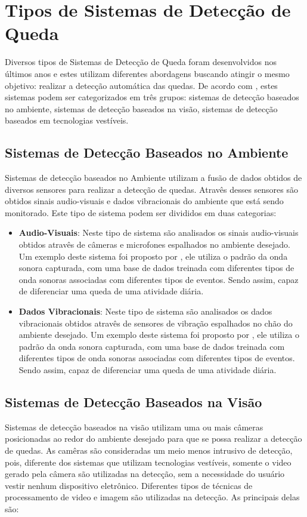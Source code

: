 \section{Tipos de Sistemas de Detecção de Queda}
\label{sec:fall_system_types}
Diversos tipos de Sistemas de Detecção de Queda foram desenvolvidos nos últimos anos e estes utilizam diferentes abordagens buscando atingir o mesmo objetivo: realizar a detecção automática das quedas. De acordo com \cite{mubashir2013survey}, estes sistemas podem ser categorizados em três grupos: sistemas de detecção baseados no ambiente, sistemas de detecção baseados na visão, sistemas de detecção baseados em tecnologias vestíveis.

\subsection{Sistemas de Detecção Baseados no Ambiente}
Sistemas de detecção baseados no Ambiente utilizam a fusão de dados obtidos de diversos sensores para realizar a detecção de quedas. Atravês desses sensores são obtidos sinais audio-visuais e dados vibracionais do ambiente que está sendo monitorado. Este tipo de sistema podem ser divididos em duas categorias:

\begin{itemize}
	\item{\textbf{Audio-Visuais}: Neste tipo de sistema são analisados os sinais audio-visuais obtidos atravês de câmeras e microfones espalhados no ambiente desejado. Um exemplo deste sistema foi proposto por \cite{zhuang2009acoustic}, ele utiliza o padrão da onda sonora capturada, com uma base de dados treinada  com diferentes tipos de onda sonoras associadas com diferentes tipos de eventos. Sendo assim, capaz de diferenciar uma queda de uma atividade diária. }
	
	\item{\textbf{Dados Vibracionais}: Neste tipo de sistema são analisados os dados vibracionais obtidos atravês de sensores de vibração espalhados no chão do ambiente desejado. Um exemplo deste sistema foi proposto por \cite{zhuang2009acoustic}, ele utiliza o padrão da onda sonora capturada, com uma base de dados treinada  com diferentes tipos de onda sonoras associadas com diferentes tipos de eventos. Sendo assim, capaz de diferenciar uma queda de uma atividade diária. }
\end{itemize}



\subsection{Sistemas de Detecção Baseados na Visão}
Sistemas de detecção baseados na visão utilizam uma ou mais câmeras posicionadas ao redor do ambiente desejado para  que se possa realizar a detecção de quedas. As camêras são consideradas um meio menos intrusivo de detecção, pois, diferente dos sistemas que utilizam tecnologias vestíveis, somente o video gerado pela câmera são utilizadas na detecção, sem a necessidade do usuário vestir nenhum dispositivo eletrônico. Diferentes tipos de técnicas de processamento de video e imagem são utilizadas na detecção. As principais delas são:  


